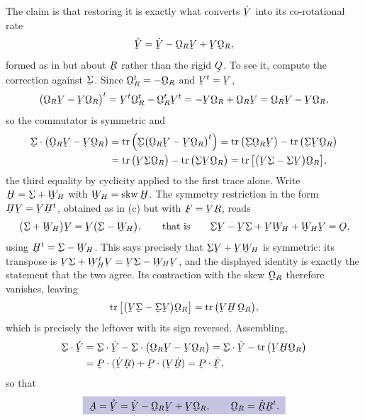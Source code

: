 \begin{solution}
The claim is that restoring it is exactly what converts $\dot\bV$ into
its co-rotational rate
\[
   \mathring\bV=\dot\bV-\bOm_{R}\bV+\bV\bOm_{R} ,
\]
formed as in  but about $\bR$ rather than the rigid $\bQ$. To
see it, compute the correction against $\vek\Sigma$. Since
$\bOm_{R}^{t}=-\bOm_{R}$ and $\bV^{t}=\bV$,
\[
   \big(\bOm_{R}\bV-\bV\bOm_{R}\big)^{t}
   =\bV^{t}\bOm_{R}^{t}-\bOm_{R}^{t}\bV^{t}
   =-\bV\bOm_{R}+\bOm_{R}\bV
   =\bOm_{R}\bV-\bV\bOm_{R} ,
\]
so the commutator is symmetric and
\[
\begin{aligned}
   \vek\Sigma\cdot\big(\bOm_{R}\bV-\bV\bOm_{R}\big)
   &=\tr\Big(\vek\Sigma\big(\bOm_{R}\bV-\bV\bOm_{R}\big)^{t}\Big)
    =\tr\big(\vek\Sigma\bOm_{R}\bV\big)
     -\tr\big(\vek\Sigma\bV\bOm_{R}\big)\\
   &=\tr\big(\bV\vek\Sigma\bOm_{R}\big)
     -\tr\big(\vek\Sigma\bV\bOm_{R}\big)
    =\tr\big[\big(\bV\vek\Sigma-\vek\Sigma\bV\big)\bOm_{R}\big],
\end{aligned}
\]
the third equality by cyclicity applied to the first trace alone.
Write $\bH=\vek\Sigma+\bW_{H}$ with $\bW_{H}=\Skw\bH$. The symmetry
restriction in the form $\bH\bV=\bV\bH^{t}$, obtained as in (c) but
with $\bF=\bV\bR$, reads
\[
   \big(\vek\Sigma+\bW_{H}\big)\bV=\bV\big(\vek\Sigma-\bW_{H}\big),
   \qquad\text{that is}\qquad
   \vek\Sigma\bV-\bV\vek\Sigma+\bV\bW_{H}+\bW_{H}\bV=\Ob ,
\]
using $\bH^{t}=\vek\Sigma-\bW_{H}$. This says precisely that
$\vek\Sigma\bV+\bV\bW_{H}$ is symmetric: its transpose is
$\bV\vek\Sigma+\bW_{H}^{t}\bV=\bV\vek\Sigma-\bW_{H}\bV$, and the
displayed identity is exactly the statement that the two agree. Its
contraction with the skew $\bOm_{R}$ therefore vanishes, leaving
\[
   \tr\big[\big(\bV\vek\Sigma-\vek\Sigma\bV\big)\bOm_{R}\big]
   =\tr\big(\bV\bH\,\bOm_{R}\big) ,
\]
which is precisely the leftover with its sign reversed. Assembling,
\[
\begin{aligned}
   \vek\Sigma\cdot\mathring\bV
   &=\vek\Sigma\cdot\dot\bV
     -\vek\Sigma\cdot\big(\bOm_{R}\bV-\bV\bOm_{R}\big)
    =\vek\Sigma\cdot\dot\bV-\tr\big(\bV\bH\bOm_{R}\big)\\
   &=\bP\cdot(\dot\bV\bR)+\bP\cdot(\bV\dot\bR)
    =\bP\cdot\dot\bF ,
\end{aligned}
\]
so that
\[
   \boxed{\;\bA=\mathring\bV=\dot\bV-\bOm_{R}\bV+\bV\bOm_{R},
   \qquad\bOm_{R}=\dot\bR\bR^{t} .\;}
\]


\end{solution}

